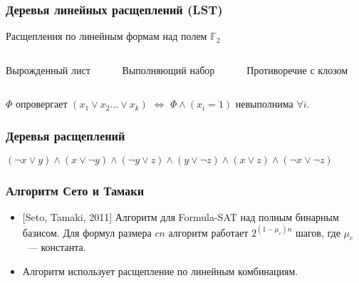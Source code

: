\begin{frame}
    \frametitle{Деревья линейных расщеплений (LST)}
	Расщепления по линейным формам над полем $\mathbb{F}_2$
    \begin{columns}
        \begin{column}{3cm}
            Вырожденный лист
            
        \end{column}
        \begin{column}{3cm}
            Выполняющий набор
            
        \end{column}
        \begin{column}{3cm}
            Противоречие с клозом
            
        \end{column}
    \end{columns}
    
	$\Phi$ опровергает $(x_1 \lor x_2 \dots \lor x_k)$ $\Leftrightarrow$ $\Phi \land (x_i = 1)$ невыполнима $\forall
    i$.
\end{frame}

\begin{frame}
    \frametitle{Деревья расщеплений}
    $(\lnot x \lor y) \land (x \lor \lnot y) \land (\lnot y \lor z) \land
    	(y \lor \lnot z) \land (x \lor z) \land (\lnot x \lor \lnot z)$ 
	\only<1>{}
	\only<2>{}
\end{frame}


\begin{frame}
    \frametitle{Алгоритм Сето и Тамаки}

	\begin{itemize}
		\item{} [Seto, Tamaki, 2011] Алгоритм для Formula-SAT над полным бинарным базисом. Для формул размера $cn$ алгоритм
		    работает $2^{(1 - \mu_c)n}$ шагов, где $\mu_c$~--- константа.
        \pause
		\item Алгоритм использует расщепление по линейным комбинациям.
	\end{itemize}    
\end{frame}



